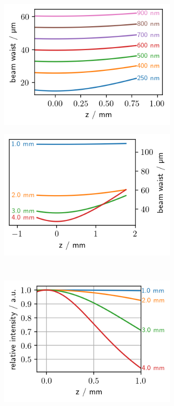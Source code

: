 \documentclass[twoside,openright]{scrreprt}
\begin{document}
\begin{figure}[h]
\centering
\begin{subfigure}[t]{0.49\textwidth}
\centering
\includegraphics[scale=1]{images/BeamWaist_Wavs_2.5mm.png} 
\end{subfigure}
\hfill
\begin{subfigure}[t]{0.49\textwidth}
\centering
\includegraphics[scale=1]{images/BeamWaist_inputWidth_653nm.png} 
\end{subfigure}
\hfill
\\
\centering
\begin{subfigure}[t]{\textwidth}
\includegraphics[scale=1]{images/DOFintensity_inputWidth_653nm.png} 

\end{subfigure}
\end{figure}
\end{document}
